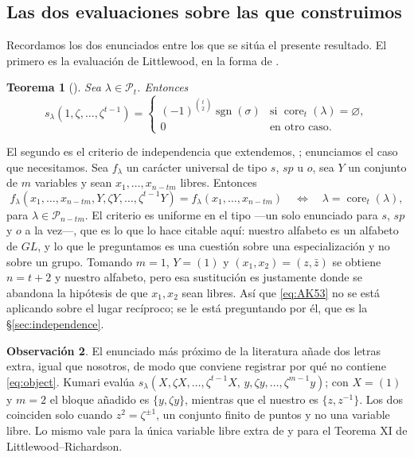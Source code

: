 \documentclass[11pt,reqno]{amsart}
\theoremstyle{plain}
\newtheorem{theorem}{Teorema}[section]
\theoremstyle{definition}
\newtheorem{remark}[theorem]{Observación}
\newcommand{\PP}{\mathcal{P}}
\newcommand{\sgn}{\operatorname{sgn}}
\newcommand{\core}{\operatorname{core}}
\newcommand{\zb}{\bar z}
\begin{document}
\subsection{Las dos evaluaciones sobre las que construimos}
Recordamos los dos enunciados entre los que se sitúa el presente resultado. El primero es la
evaluación de Littlewood, en la forma de \cite[Teorema 2.2]{AK25}.

\begin{theorem}[{\cite[Teorema IX]{LR34}}]\label{thm:LR}
Sea $\lambda\in\PP_t$. Entonces
\[
s_\lambda(1,\zeta,\dots,\zeta^{t-1})=
\begin{cases}
(-1)^{\binom{t}{2}}\sgn(\sigma) & \text{si }\core_t(\lambda)=\varnothing,\\
0 & \text{en otro caso.}
\end{cases}
\]
\end{theorem}

El segundo es el criterio de independencia que extendemos, \cite[Teorema 5.3]{AK25}; enunciamos el
caso que necesitamos. Sea $f_\lambda$ un carácter universal de tipo $s$, $sp$ u $o$, sea $Y$ un
conjunto de $m$ variables y sean $x_1,\dots,x_{n-tm}$ libres. Entonces
\begin{equation}\label{eq:AK53}
f_\lambda(x_1,\dots,x_{n-tm},Y,\zeta Y,\dots,\zeta^{t-1}Y)=f_\lambda(x_1,\dots,x_{n-tm})
\quad\Longleftrightarrow\quad \lambda=\core_t(\lambda),
\end{equation}
para $\lambda\in\PP_{n-tm}$. El criterio es uniforme en el tipo ---un solo enunciado para $s$, $sp$ y
$o$ a la vez---, que es lo que lo hace citable aquí: nuestro alfabeto es un alfabeto de $GL$, y lo
que le preguntamos es una cuestión sobre una especialización y no sobre un grupo. Tomando $m=1$,
$Y=(1)$ y $(x_1,x_2)=(z,\zb)$ se obtiene $n=t+2$ y nuestro alfabeto, pero esa sustitución es
justamente donde se abandona la hipótesis de que $x_1,x_2$ sean libres. Así que \eqref{eq:AK53} no se
está aplicando sobre el lugar recíproco; se le está preguntando por él, que es la
\S\ref{sec:independence}.

\begin{remark}\label{rem:notacase}
El enunciado más próximo de la literatura añade dos letras extra, igual que nosotros, de modo que
conviene registrar por qué no contiene \eqref{eq:object}. Kumari \cite[Teorema 2.2]{Kum24} evalúa
$s_\lambda(X,\zeta X,\dots,\zeta^{t-1}X,\,y,\zeta y,\dots,\zeta^{m-1}y)$; con $X=(1)$ y $m=2$ el
bloque añadido es $\{y,\zeta y\}$, mientras que el nuestro es $\{z,z^{-1}\}$. Los dos coinciden solo
cuando $z^{2}=\zeta^{\pm1}$, un conjunto finito de puntos y no una variable libre. Lo mismo vale para
la única variable libre extra de \cite[Teorema 2.7]{AK22} y para el Teorema XI de
Littlewood--Richardson.
\end{remark}
\end{document}
